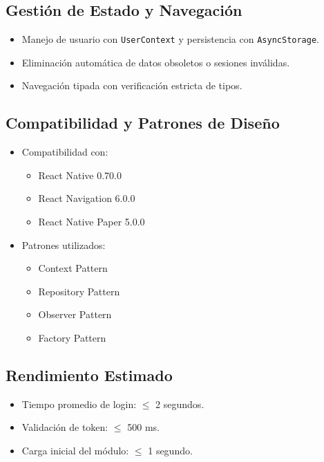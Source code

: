 \documentclass[11pt, a4paper, oneside]{book}
\begin{document}
\subsection*{Gestión de Estado y Navegación}

\begin{itemize}
    \item Manejo de usuario con \texttt{UserContext} y persistencia con \texttt{AsyncStorage}.
    \item Eliminación automática de datos obsoletos o sesiones inválidas.
    \item Navegación tipada con verificación estricta de tipos.
\end{itemize}

\subsection*{Compatibilidad y Patrones de Diseño}

\begin{itemize}
    \item Compatibilidad con:
        \begin{itemize}
            \item React Native 0.70.0
            \item React Navigation 6.0.0
            \item React Native Paper 5.0.0
        \end{itemize}
    \item Patrones utilizados:
        \begin{itemize}
            \item Context Pattern
            \item Repository Pattern
            \item Observer Pattern
            \item Factory Pattern
        \end{itemize}
\end{itemize}

\subsection*{Rendimiento Estimado}

\begin{itemize}
    \item Tiempo promedio de login: $\leq$ 2 segundos.
    \item Validación de token: $\leq$ 500 ms.
    \item Carga inicial del módulo: $\leq$ 1 segundo.
\end{itemize}
\end{document}
